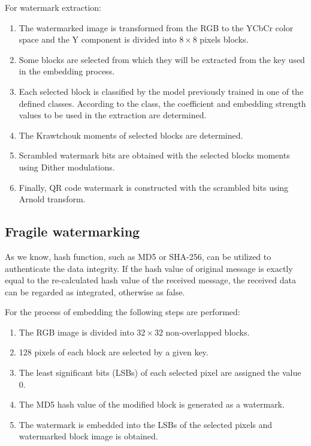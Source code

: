 \documentclass[runningheads]{llncs}
\begin{document}
For watermark extraction:
\begin{enumerate}
	\item The watermarked image is transformed from the RGB to the YCbCr color space and the Y component is divided into $8\times 8$ pixels blocks.
	\item Some blocks are selected from which they will be extracted from the key used in the embedding process.
	\item Each selected block is classified by the model previously trained in one of the defined classes. According to the class, the coefficient and embedding strength values to be used in the extraction are determined.
	\item The Krawtchouk moments of selected blocks are determined.
	\item Scrambled watermark bits are obtained with the selected blocks moments using Dither modulations.
	\item Finally, QR code watermark is constructed with the scrambled bits using Arnold transform.
\end{enumerate}

\subsection{Fragile watermarking}
As we know, hash function, such as MD5 or SHA-256, can be utilized to authenticate the data integrity. If the hash value of original message is exactly equal to the re-calculated hash value of the received message, the received data can be regarded as integrated, otherwise as false.

For the process of embedding the following steps are performed:
\begin{enumerate}
	\item The RGB image is divided into $32\times 32$ non-overlapped blocks.
	\item 128 pixels of each block are selected by a given key.
	\item The least significant bits (LSBs) of each selected pixel are assigned the value 0.
	\item The MD5 hash value of the modified block is generated as a watermark.
	\item The watermark is embedded into the LSBs of the selected pixels and watermarked block image is obtained.  
\end{enumerate}    
\end{document}
